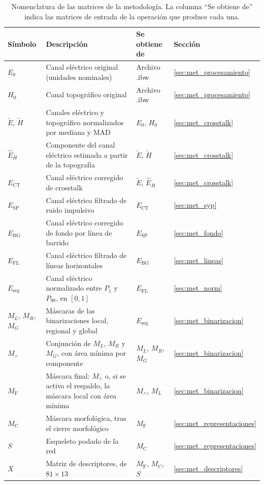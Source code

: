 \begin{table}[H]
\centering
\caption{Nomenclatura de las matrices de la metodología. La columna ``Se obtiene de'' indica las matrices de entrada de la operación que produce cada una.}
\label{tab:nomenclatura}
\small
\begin{tabular}{@{}l p{7.4cm} l l@{}}
\toprule
\textbf{Símbolo} & \textbf{Descripción} & \textbf{Se obtiene de} & \textbf{Sección} \\
\midrule
$E_0$ & Canal eléctrico original (unidades nominales) & Archivo .ibw & \ref{sec:met_procesamiento} \\
$H_0$ & Canal topográfico original & Archivo .ibw & \ref{sec:met_procesamiento} \\
$\tilde E$, $\tilde H$ & Canales eléctrico y topográfico normalizados por mediana y MAD & $E_0$, $H_0$ & \ref{sec:met_crosstalk} \\
$\hat E_H$ & Componente del canal eléctrico estimada a partir de la topografía & $\tilde E$, $\tilde H$ & \ref{sec:met_crosstalk} \\
$E_{\mathrm{CT}}$ & Canal eléctrico corregido de crosstalk & $\tilde E$, $\hat E_H$ & \ref{sec:met_crosstalk} \\
$E_{\mathrm{SP}}$ & Canal eléctrico filtrado de ruido impulsivo & $E_{\mathrm{CT}}$ & \ref{sec:met_syp} \\
$E_{\mathrm{BG}}$ & Canal eléctrico corregido de fondo por línea de barrido & $E_{\mathrm{SP}}$ & \ref{sec:met_fondo} \\
$E_{\mathrm{FL}}$ & Canal eléctrico filtrado de líneas horizontales & $E_{\mathrm{BG}}$ & \ref{sec:met_lineas} \\
$E_{\mathrm{seg}}$ & Canal eléctrico normalizado entre $P_1$ y $P_{99}$, en $[0,1]$ & $E_{\mathrm{FL}}$ & \ref{sec:met_norm} \\
$M_L$, $M_R$, $M_G$ & Máscaras de las binarizaciones local, regional y global & $E_{\mathrm{seg}}$ & \ref{sec:met_binarizacion} \\
$M_\wedge$ & Conjunción de $M_L$, $M_R$ y $M_G$, con área mínima por componente & $M_L$, $M_R$, $M_G$ & \ref{sec:met_binarizacion} \\
$M_{\mathrm{F}}$ & Máscara final: $M_\wedge$ o, si se activa el respaldo, la máscara local con área mínima & $M_\wedge$, $M_L$ & \ref{sec:met_binarizacion} \\
$M_{\mathrm{C}}$ & Máscara morfológica, tras el cierre morfológico & $M_{\mathrm{F}}$ & \ref{sec:met_representaciones} \\
$S$ & Esqueleto podado de la red & $M_{\mathrm{C}}$ & \ref{sec:met_representaciones} \\
$X$ & Matriz de descriptores, de $81\times13$ & $M_{\mathrm{F}}$, $M_{\mathrm{C}}$, $S$ & \ref{sec:met_descriptores} \\
\bottomrule
\end{tabular}
\end{table}

